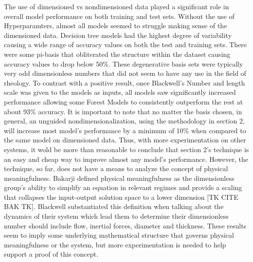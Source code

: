 \documentclass{article}
\theoremstyle{definition}
\begin{document}
The use of dimensioned vs nondimensioned data played a significant role in overall model performance on both training and test sets.   Without the use of Hyperparamters, almost all models seemed to struggle  making sense of the dimensioned data.  Decision tree models had the highest degree of variability causing a wide range of accuracy values on both the test and training sets.   There were some pi-basis that obliterated the structure within the dataset causing accuracy values to drop below 50\%.   These degenerative basis sets were typically very odd dimensionless numbers that did not seem to have any use in the field of rheology.   To contrast with a positive result, once Blackwell's Number and length scale was given to the models as inputs,  all models  saw significantly increased performance allowing some Forest Models to consistently outperform the rest at about 93\% accuracy.   It is important to note that no matter the basis chosen, in general, an unguided nondimensionalization, using the methodology in section 2, will increase most model's performance by a minimum of 10\% when compared to the same model on dimensioned data.   Thus, with more experimentation on other systems, it wold be more than reasonable to conclude that section 2's technique is an easy and cheap way to improve almost any model's performance.  However, the technique, so far, does not have a means to analyze the concept of physical meaningfulness.    Bakarji  defined physical meaningfulness as the dimensionless group’s ability to simplify an equation in relevant regimes and provide a scaling that collapses the input-output solution space to a lower dimension [TK CITE BAK TK].   Blackwell substantiated this definition when talking about the dynamics of their system which lead them to determine their dimensionless number should include flow, inertial forces, diameter and thickness.  These results seem to imply some underlying mathematical structure that governs physical meaningfulness or the system, but more experimentation is needed to help support a proof of this concept.   

\end{document}
